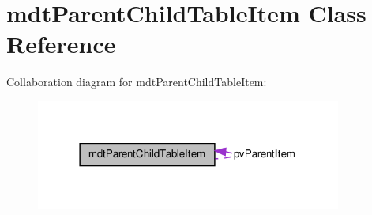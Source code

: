 \hypertarget{classmdt_parent_child_table_item}{
\section{mdtParentChildTableItem Class Reference}
\label{classmdt_parent_child_table_item}
}


Collaboration diagram for mdtParentChildTableItem:\nopagebreak
\begin{figure}[H]
\begin{center}
\leavevmode
\includegraphics[width=285pt]{classmdt_parent_child_table_item__coll__graph}
\end{center}
\end{figure}
